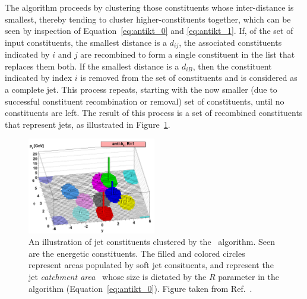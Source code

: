 The \antikt algorithm proceeds by clustering those constituents whose inter-distance is smallest, thereby tending to cluster
higher-\pT constituents together, which can be seen by inspection of Equation~\ref{eq:antikt_0} and \ref{eq:antikt_1}.
If, of the set of input constituents, the smallest distance is a $d_{ij}$, the associated constituents indicated by $i$
and $j$ are recombined to form a single constituent in the list that replaces them both.
If the smallest distance is a $d_{iB}$, then the constituent indicated by index $i$ is removed from the set of constituents
and is considered as a complete jet.
This process repeats, starting with the now smaller (due to successful constituent recombination or removal) set of constituents,
until no constituents are left.
The result of this process is a set of recombined constituents that represent jets, as illustrated in Figure~\ref{fig:antikt_circles}.

\begin{figure}[!htb]
    \begin{center}
        \includegraphics[width=0.5\textwidth]{figures/chapter3/jets/antikt_jet_circles}
        \caption{
            An illustration of jet constituents clustered by the \antikt~algorithm. Seen
            are the energetic constituents.
            The filled and colored circles represent areas populated by soft jet consituents, and represent the jet \textit{catchment area}~\cite{Cacciari:2008gn}
            whose size is dictated by the $R$ parameter in the \antikt algorithm (Equation~\ref{eq:antikt_0}).
            Figure taken from Ref.~\cite{Cacciari:2008gp}.
        }
        \label{fig:antikt_circles}
    \end{center}
\end{figure}

\FloatBarrier
%
%


